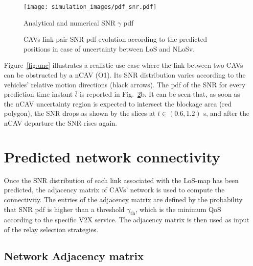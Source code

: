 \documentclass[journal]{IEEEtran}
\begin{document}
\begin{figure} [t!]
    \centering
    \texttt{[image: simulation\_images/pdf\_snr.pdf]}
    \caption{Analytical and numerical SNR $\gamma$ pdf}
    \label{fig:sim_teo}
\end{figure}

\begin{figure}[!t] 
\centering
{}

\caption{CAVs link pair SNR pdf evolution according to the predicted positions in case of uncertainty between LoS and NLoSv.}
\label{fig:ac}
\end{figure}

Figure~\ref{fig:unc} illustrates a realistic use-case where the link between two CAVs can be obstructed by a nCAV (O1). Its SNR distribution varies according to the vehicles' relative motion directions (black arrows). The pdf of the SNR for every prediction time instant $\bar{t}$ is reported in Fig.~\ref{fig:ac}b. It can be seen that, as soon as the nCAV uncertainty region is expected to intersect the blockage area (red polygon), the SNR drops as shown by the slices at $t\in(0.6,1.2)$ s, and after the nCAV departure the SNR rises again.




\section{Predicted network connectivity}

Once the SNR distribution of each link associated with the LoS-map has been predicted, the adjacency matrix of CAVs' network is used to compute the connectivity. The entries of the adjacency matrix are defined by the probability that SNR pdf is higher than a threshold $\gamma_{\text{th}}$, which is the minimum QoS according to the specific V2X service.  
The adjacency matrix is then used as input of the relay selection strategies.

\subsection{Network Adjacency matrix} \label{sec:graph}
\end{document}
